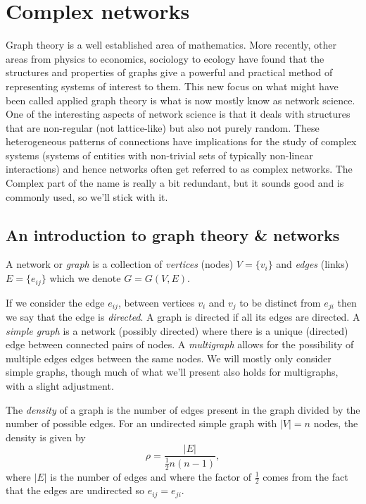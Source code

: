 \documentclass{article}
\begin{document}
\section{Complex networks}

Graph theory is a well established area of mathematics. More recently, other areas from physics to economics, sociology to ecology have found that the structures and properties of graphs give a powerful and practical method of representing systems of interest to them. This new focus on what might have been called applied graph theory is what is now mostly know as network science. One of the interesting aspects of network science is that it deals with structures that are non-regular (not lattice-like) but also not purely random. These heterogeneous patterns of connections have implications for the study of complex systems (systems of entities with non-trivial sets of typically non-linear interactions) and hence networks often get referred to as complex networks. The Complex part of the name is really a bit redundant, but it sounds good and is commonly used, so we'll stick with it.

\subsection{An introduction to graph theory \& networks}

A network or \emph{graph} is a collection of \emph{vertices} (nodes) $V=\{v_i\}$ and \emph{edges} (links) $E=\{e_{ij}\}$ which we denote $G= G(V,E)$.

If we consider the edge $e_{ij}$, between vertices $v_i$ and $v_j$ to be distinct from $e_{ji}$ then we say that the edge is \emph{directed}. A graph is directed if all its edges are directed. A \emph{simple graph} is a network (possibly directed) where there is a unique (directed) edge between connected pairs of nodes. A \emph{multigraph} allows for the possibility of multiple edges edges between the same nodes. We will mostly only consider simple graphs, though much of what we'll present also holds for multigraphs, with a slight adjustment. 

The \emph{density} of a graph is the number of edges present in the graph divided by the number of possible edges. For an undirected simple graph with $|V|=n$ nodes, the density is given by
$$
	\rho = \frac{|E|}{\frac12 n(n-1)},
$$
where $|E|$ is the number of edges and where the factor of $\frac12$ comes from the fact that the edges are undirected so $e_{ij}=e_{ji}$. 
\end{document}
